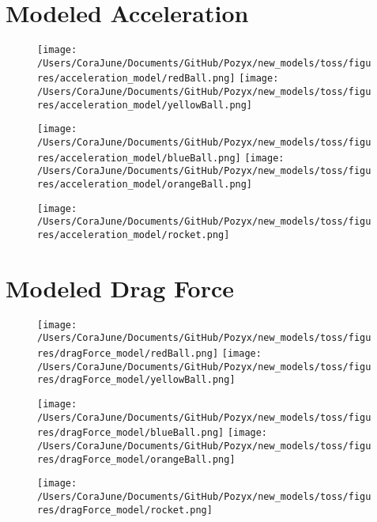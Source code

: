 \documentclass{article}
\begin{document}
\section{Modeled Acceleration}
\begin{figure}[h!]
\begin{multicols}{2}
    \texttt{[image: /Users/CoraJune/Documents/GitHub/Pozyx/new\_models/toss/figures/acceleration\_model/redBall.png]}
    \texttt{[image: /Users/CoraJune/Documents/GitHub/Pozyx/new\_models/toss/figures/acceleration\_model/yellowBall.png]}
\end{multicols}

\begin{multicols}{2}
    \texttt{[image: /Users/CoraJune/Documents/GitHub/Pozyx/new\_models/toss/figures/acceleration\_model/blueBall.png]}
    \texttt{[image: /Users/CoraJune/Documents/GitHub/Pozyx/new\_models/toss/figures/acceleration\_model/orangeBall.png]}
\end{multicols}

    \texttt{[image: /Users/CoraJune/Documents/GitHub/Pozyx/new\_models/toss/figures/acceleration\_model/rocket.png]}
\end{figure}
\newpage
\section{Modeled Drag Force}
\begin{figure}[h!]
\begin{multicols}{2}
    \texttt{[image: /Users/CoraJune/Documents/GitHub/Pozyx/new\_models/toss/figures/dragForce\_model/redBall.png]}
    \texttt{[image: /Users/CoraJune/Documents/GitHub/Pozyx/new\_models/toss/figures/dragForce\_model/yellowBall.png]}
\end{multicols}

\begin{multicols}{2}
    \texttt{[image: /Users/CoraJune/Documents/GitHub/Pozyx/new\_models/toss/figures/dragForce\_model/blueBall.png]}
    \texttt{[image: /Users/CoraJune/Documents/GitHub/Pozyx/new\_models/toss/figures/dragForce\_model/orangeBall.png]}
\end{multicols}

    \texttt{[image: /Users/CoraJune/Documents/GitHub/Pozyx/new\_models/toss/figures/dragForce\_model/rocket.png]}
\end{figure}
\newpage
\end{document}
